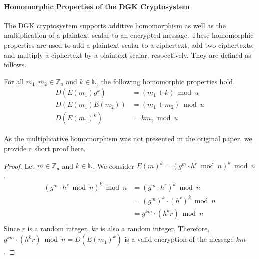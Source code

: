 


\paragraph{Homomorphic Properties of the DGK Cryptosystem}
The DGK cryptosystem supports additive homomorphism as well as the multiplication of a plaintext scalar to an encrypted message. These homomorphic properties are used to add a plaintext scalar to a ciphertext, add two ciphertexts, and multiply a ciphertext by a plaintext scalar, respectively. They are defined as follows.

For all $m_1,m_2 \in \mathbb{Z}_u$ and $k\in \mathbb{N}$, the following homomorphic properties hold.
\begin{align*}
    D(E(m_1)g^k) &=(m_1+k)\bmod u\\
    D(E(m_1)E(m_2)) &=(m_1+m_2)\bmod u\\
    D(E(m_1)^k) &= km_1\bmod u
\end{align*}

As the multiplicative homomorphism was not presented in the original paper, we provide a short proof here.
\begin{proof}
  Let $m \in \mathbb{Z}_u$ and $k\in \mathbb{N}$.
  We consider $E(m)^k = (g^m \cdot h^r \bmod{n})^k\bmod n$.
  \begin{align*}
    (g^m \cdot h^r \bmod{n})^k \bmod n
    &= (g^m \cdot h^r)^k \bmod{n}\\
    &= (g^m)^k \cdot (h^r)^k \bmod{n}\\
    &= g^{km} \cdot (h^kr) \bmod{n}\\
  \end{align*}
  Since $r$ is a random integer, $kr$ is also a random integer, Therefore, $g^{km} \cdot (h^kr) \bmod{n} = D(E(m_1)^k)$ is a valid encryption of the message $km$.
\end{proof}


